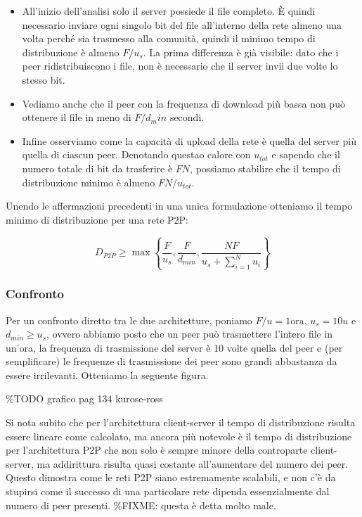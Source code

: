 \begin{itemize}
\item
  All'inizio dell'analisi solo il server possiede il file completo. È
  quindi necessario inviare ogni singolo bit del file all'interno della
  rete almeno una volta perché sia trasmesso alla comunità, quindi il
  minimo tempo di distribuzione è almeno $F/u_s$. La prima differenza è
  già visibile: dato che i peer ridistribuiscono i file, non è
  necessario che il server invii due volte lo stesso bit.
\item
  Vediamo anche che il peer con la frequenza di download più bassa non
  può ottenere il file in meno di $F/d_min$ secondi.
\item
  Infine osserviamo come la capacità di upload della rete è quella del
  server più quella di ciascun peer. Denotando questao calore con
  $u_{tot}$ e sapendo che il numero totale di bit da trasferire è $FN$,
  possiamo stabilire che il tempo di distribuzione minimo è almeno
  $FN/u_{tot}$.
\end{itemize}

Unendo le affermazioni precedenti in una unica formulazione otteniamo il
tempo minimo di distribuzione per una rete P2P:

\[ D_{P2P} \geq \max \left\lbrace \frac{F}{u_s}, \frac{F}{d_{min}}, \frac{NF}{u_s + \sum_{i = 1}^N u_i} \right\rbrace \]

\subsubsection{Confronto}\label{confronto}

Per un confronto diretto tra le due architetture, poniamo
$F/u = 1 \text{ora}$, $u_s = 10u$ e $d_{min} \geq u_s$, ovvero abbiamo
posto che un peer può trasmettere l'intero file in un'ora, la frequenza
di trasmissione del server è 10 volte quella del peer e (per
semplificare) le frequenze di trasmissione dei peer sono grandi
abbastanza da essere irrilevanti. Otteniamo la seguente figura.

\%TODO grafico pag 134 kurose-ross

Si nota subito che per l'architettura client-server il tempo di
distribuzione risulta essere lineare come calcolato, ma ancora più
notevole è il tempo di distribuzione per l'architettura P2P che non solo
è sempre minore della controparte client-server, ma addirittura risulta
quasi costante all'aumentare del numero dei peer. Questo dimostra come
le reti P2P siano estremamente scalabili, e non c'è da stupirsi come il
successo di una particolare rete dipenda essenzialmente dal numero di
peer presenti. \%FIXME: questa è detta molto male.

